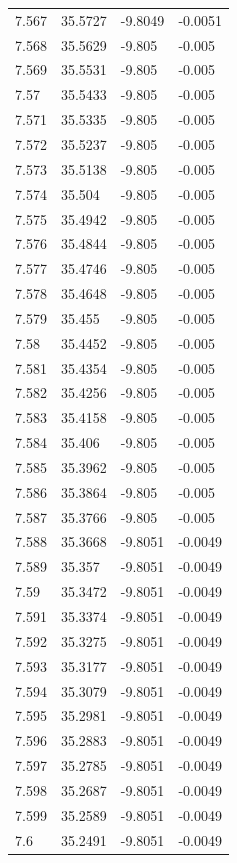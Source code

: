 \begin{tabular}{llll}
7.567 & 35.5727 & -9.8049 & -0.0051 \\
7.568 & 35.5629 & -9.805 & -0.005 \\
7.569 & 35.5531 & -9.805 & -0.005 \\
7.57 & 35.5433 & -9.805 & -0.005 \\
7.571 & 35.5335 & -9.805 & -0.005 \\
7.572 & 35.5237 & -9.805 & -0.005 \\
7.573 & 35.5138 & -9.805 & -0.005 \\
7.574 & 35.504 & -9.805 & -0.005 \\
7.575 & 35.4942 & -9.805 & -0.005 \\
7.576 & 35.4844 & -9.805 & -0.005 \\
7.577 & 35.4746 & -9.805 & -0.005 \\
7.578 & 35.4648 & -9.805 & -0.005 \\
7.579 & 35.455 & -9.805 & -0.005 \\
7.58 & 35.4452 & -9.805 & -0.005 \\
7.581 & 35.4354 & -9.805 & -0.005 \\
7.582 & 35.4256 & -9.805 & -0.005 \\
7.583 & 35.4158 & -9.805 & -0.005 \\
7.584 & 35.406 & -9.805 & -0.005 \\
7.585 & 35.3962 & -9.805 & -0.005 \\
7.586 & 35.3864 & -9.805 & -0.005 \\
7.587 & 35.3766 & -9.805 & -0.005 \\
7.588 & 35.3668 & -9.8051 & -0.0049 \\
7.589 & 35.357 & -9.8051 & -0.0049 \\
7.59 & 35.3472 & -9.8051 & -0.0049 \\
7.591 & 35.3374 & -9.8051 & -0.0049 \\
7.592 & 35.3275 & -9.8051 & -0.0049 \\
7.593 & 35.3177 & -9.8051 & -0.0049 \\
7.594 & 35.3079 & -9.8051 & -0.0049 \\
7.595 & 35.2981 & -9.8051 & -0.0049 \\
7.596 & 35.2883 & -9.8051 & -0.0049 \\
7.597 & 35.2785 & -9.8051 & -0.0049 \\
7.598 & 35.2687 & -9.8051 & -0.0049 \\
7.599 & 35.2589 & -9.8051 & -0.0049 \\
7.6 & 35.2491 & -9.8051 & -0.0049 \\

\end{tabular}
